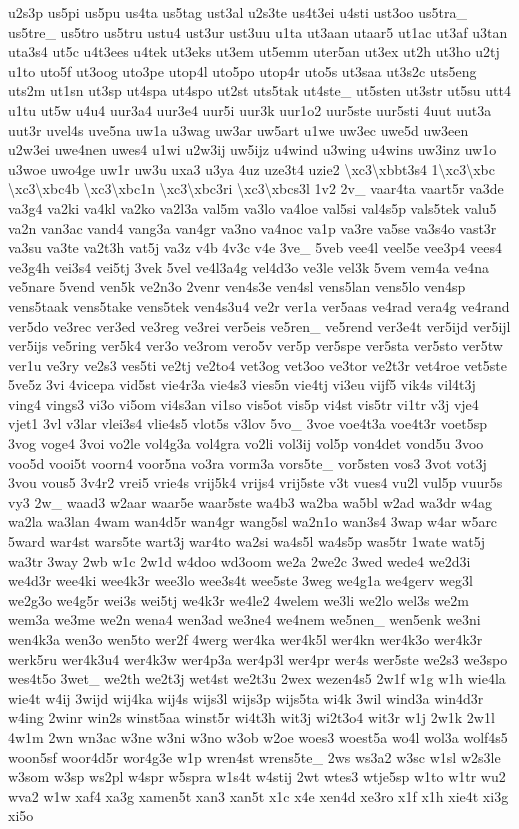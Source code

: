 {u2s3p us5pi us5pu us4ta us5tag ust3al u2s3te us4t3ei u4sti ust3oo us5tra\-\_\- us5tre\-\_\- us5tro us5tru ustu4 ust3ur ust3uu u1ta ut3aan utaar5 ut1ac ut3af u3tan uta3s4 ut5c u4t3ees u4tek ut3eks ut3em ut5emm uter5an ut3ex ut2h ut3ho u2tj u1to uto5f ut3oog uto3pe utop4l uto5po utop4r uto5s ut3saa ut3s2c uts5eng uts2m ut1sn ut3sp ut4spa ut4spo ut2st uts5tak ut4ste\-\_\- ut5sten ut3str ut5su utt4 u1tu ut5w u4u4 uur3a4 uur3e4 uur5i uur3k uur1o2 uur5ste uur5sti 4uut uut3a uut3r uvel4s uve5na uw1a u3wag uw3ar uw5art u1we uw3ec uwe5d uw3een u2w3ei uwe4nen uwes4 u1wi u2w3ij uw5ijz u4wind u3wing u4wins uw3inz uw1o u3woe uwo4ge uw1r uw3u uxa3 u3ya 4uz uze3t4 uzie2 \textbackslash{}xc3\textbackslash{}xbbt3s4 1\textbackslash{}xc3\textbackslash{}xbc \textbackslash{}xc3\textbackslash{}xbc4b \textbackslash{}xc3\textbackslash{}xbc1n \textbackslash{}xc3\textbackslash{}xbc3ri \textbackslash{}xc3\textbackslash{}xbcs3l 1v2 2v\-\_\- vaar4ta vaart5r va3de va3g4 va2ki va4kl va2ko va2l3a val5m va3lo va4loe val5si val4s5p vals5tek valu5 va2n van3ac vand4 vang3a van4gr va3no va4noc va1p va3re va5se va3s4o vast3r va3su va3te va2t3h vat5j va3z v4b 4v3c v4e 3ve\-\_\- 5veb vee4l veel5e vee3p4 vees4 ve3g4h vei3s4 vei5tj 3vek 5vel ve4l3a4g vel4d3o ve3le vel3k 5vem vem4a ve4na ve5nare 5vend ven5k ve2n3o 2venr ven4s3e ven4sl vens5lan vens5lo ven4sp vens5taak vens5take vens5tek ven4s3u4 ve2r ver1a ver5aas ve4rad vera4g ve4rand ver5do ve3rec ver3ed ve3reg ve3rei ver5eis ve5ren\-\_\- ve5rend ver3e4t ver5ijd ver5ijl ver5ijs ve5ring ver5k4 ver3o ve3rom vero5v ver5p ver5spe ver5sta ver5sto ver5tw ver1u ve3ry ve2s3 ves5ti ve2tj ve2to4 vet3og vet3oo ve3tor ve2t3r vet4roe vet5ste 5ve5z 3vi 4vicepa vid5st vie4r3a vie4s3 vies5n vie4tj vi3eu vijf5 vik4s vil4t3j ving4 vings3 vi3o vi5om vi4s3an vi1so vis5ot vis5p vi4st vis5tr vi1tr v3j vje4 vjet1 3vl v3lar vlei3s4 vlie4s5 vlot5s v3lov 5vo\-\_\- 3voe voe4t3a voe4t3r voet5sp 3vog voge4 3voi vo2le vol4g3a vol4gra vo2li vol3ij vol5p von4det vond5u 3voo voo5d vooi5t voorn4 voor5na vo3ra vorm3a vors5te\-\_\- vor5sten vos3 3vot vot3j 3vou vous5 3v4r2 vrei5 vrie4s vrij5k4 vrijs4 vrij5ste v3t vues4 vu2l vul5p vuur5s vy3 2w\-\_\- waad3 w2aar waar5e waar5ste wa4b3 wa2ba wa5bl w2ad wa3dr w4ag wa2la wa3lan 4wam wan4d5r wan4gr wang5sl wa2n1o wan3s4 3wap w4ar w5arc 5ward war4st wars5te wart3j war4to wa2si wa4s5l wa4s5p was5tr 1wate wat5j wa3tr 3way 2wb w1c 2w1d w4doo wd3oom we2a 2we2c 3wed wede4 we2d3i we4d3r wee4ki wee4k3r wee3lo wee3s4t wee5ste 3weg we4g1a we4gerv weg3l we2g3o we4g5r wei3s wei5tj we4k3r we4le2 4welem we3li we2lo wel3s we2m wem3a we3me we2n wena4 wen3ad we3ne4 we4nem we5nen\-\_\- wen5enk we3ni wen4k3a wen3o wen5to wer2f 4werg wer4ka wer4k5l wer4kn wer4k3o wer4k3r werk5ru wer4k3u4 wer4k3w wer4p3a wer4p3l wer4pr wer4s wer5ste we2s3 we3spo wes4t5o 3wet\-\_\- we2th we2t3j wet4st we2t3u 2wex wezen4s5 2w1f w1g w1h wie4la wie4t w4ij 3wijd wij4ka wij4s wijs3l wijs3p wijs5ta wi4k 3wil wind3a win4d3r w4ing 2winr win2s winst5aa winst5r wi4t3h wit3j wi2t3o4 wit3r w1j 2w1k 2w1l 4w1m 2wn wn3ac w3ne w3ni w3no w3ob w2oe woes3 woest5a wo4l wol3a wolf4s5 woon5sf woor4d5r wor4g3e w1p wren4st wrens5te\-\_\- 2ws ws3a2 w3sc w1sl w2s3le w3som w3sp ws2pl w4spr w5spra w1s4t w4stij 2wt wtes3 wtje5sp w1to w1tr wu2 wva2 w1w xaf4 xa3g xamen5t xan3 xan5t x1c x4e xen4d xe3ro x1f x1h xie4t xi3g xi5o }
